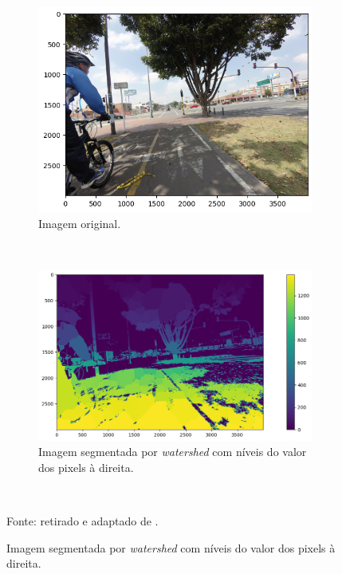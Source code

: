 \begin{figure}[H]
   \caption{Exemplos de segmentação com a aplicação de \textit{watershed}.}
   \centering
   \label{segment:fig:watershed_1}
    \begin{subfigure}[t]{0.5\textwidth}
        \centering
        \includegraphics[width=1\linewidth]{recursos/imagens/image_seg/original_watershed.png}
        \caption{Imagem original.}
        \label{segment:fig:watershed_1.1}
    \end{subfigure}%
    ~ 

    \begin{subfigure}[t]{0.5\textwidth}
        \centering
        \includegraphics[width=1\linewidth]{recursos/imagens/image_seg/segmented_watershed.png}
        \caption{Imagem segmentada por \textit{watershed} com níveis do valor dos pixels à direita.}
        \label{segment:fig:watershed_1.2}
    \end{subfigure}%
    ~

    Fonte: retirado e adaptado de \cite{Neuhold2017_ICCV}.
\end{figure}


